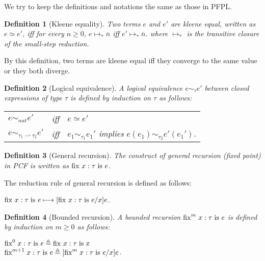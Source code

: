 \documentclass{article}
\newtheorem{definition}{Definition}
\begin{document}
We try to keep the definitions and notations the same as those in PFPL.

\begin{definition}[Kleene equality]
  Two terms $e$ and $e'$ are kleene equal, written as $e\simeq e'$,
  iff for every $n\ge 0$, $e\longmapsto_*\overline{n}$ iff $e'\longmapsto_*\overline{n}$.
  where $\longmapsto_*$ is the transitive closure of the small-step reduction.
\end{definition}

By this definition, two terms are kleene equal iff they converge to
the same value or they both diverge.

\begin{definition}[Logical equivalence]
  A logical equivalence $e\sim_{\tau} e'$ between closed expressions of type $\tau$
  is defined by induction on $\tau$ as follows:

  \begin{center}
    \begin{tabular}{lll}
      $e\sim_{\textit{nat}}e'$ & iff & $e\simeq e'$ \\
      $e\sim_{\tau_1\rightharpoonup\tau_2}e'$ & iff & $e_1 \sim_{\tau_1}e_1'$ implies $e(e_1)\sim_{\tau_2}e'(e_1')$.
    \end{tabular}
  \end{center}

\end{definition}

\begin{definition}[General recursion]
  The construct of general recursion (fixed point) in PCF is written as $\mathrm{fix}^{}\;x:\tau\;\mathrm{is}\;\mathit{e}$.
\end{definition}

The reduction rule of general recursion is defined as follows:

\begin{center}
  $\mathrm{fix}^{}\;x:\tau\;\mathrm{is}\;\mathit{e}\longmapsto [\mathrm{fix}^{}\;x:\tau\;\mathrm{is}\;\mathit{e}/x]e$.
\end{center}

\begin{definition}[Bounded recursion]
  A bounded recursion $\mathrm{fix}^{m}\;x:\tau\;\mathrm{is}\;\mathit{e}$ is defined by induction on $m\ge 0$ as follows:

  \begin{center}
    $\mathrm{fix}^{0}\;x:\tau\;\mathrm{is}\;\mathit{e}\triangleq\mathrm{fix}^{}\;x:\tau\;\mathrm{is}\;\mathit{x}$ \\
    $\mathrm{fix}^{m+1}\;x:\tau\;\mathrm{is}\;\mathit{e}\triangleq[\mathrm{fix}^{m}\;x:\tau\;\mathrm{is}\;\mathit{e}/x]e$.
  \end{center}
\end{definition}
\end{document}
